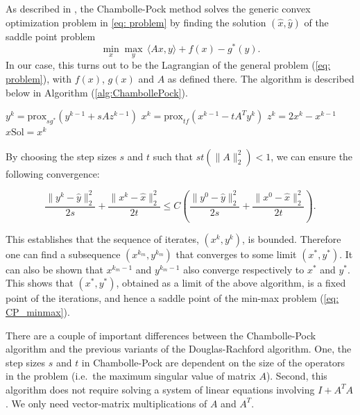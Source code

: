 \documentclass[12pt]{article}
\begin{document}
As described in \cite{Chambolle2010}, the Chambolle-Pock method solves the generic convex optimization problem in \ref{eq: problem} by finding the solution $(\hat{x}, \hat{y})$ of the saddle point problem
\begin{equation}
 \min_{x}\max_{y} \, \langle Ax, y \rangle + f(x) - g^{*}(y). \label{eq: CP_minmax}
\end{equation}
In our case, this turns out to be the Lagrangian of the general
problem (\ref{eq: problem}),  with $f(x)$, $g(x)$ and $A$ as defined
there. The algorithm is described below in Algorithm (\ref{alg:ChambollePock}). 

\begin{algorithm}[h!]

 {
  $ y^k = \text{prox}_{sg^{*}}(y^{k - 1} + sAz^{k-1})$    \;
  $ x^k = \text{prox}_{tf}(x^{k-1} - tA^{T}y^{k})$ \;
  $	z^{k}  = 2x^{k}  - x^{k-1} $ \;
} 
\Return $x\text{Sol} = x^{k}$\;
\caption{Chambolle-Pock Algorithm}\label{alg:ChambollePock} 
\end{algorithm}
By choosing the step sizes $s$ and $t$ such that $st(\|A\|_{2}^{2}) < 1$, we can ensure the following convergence:

\begin{equation}
 \frac{\| y^{k} - \hat{y}\|_{2}^{2}}{2s}  + \frac{\| x^{k} - \hat{x} \|_{2}^{2}}{2t} \leq C \left(\frac{\| y^0 - \hat{y}\|_{2}^{2}}{2s}  + \frac{\|x^0 - \hat{x}\|_{2}^{2}}{2t} \right). \label{eq: CP_conv}
\end{equation}

This establishes that the sequence of iterates, $(x^k, y^k)$, is bounded. Therefore one can find a subsequence $(x^{k_m}, y^{k_m})$ that converges to some limit $(x^*, y^*)$. It can also be shown that $x^{k_m - 1}$ and $y^{k_m - 1}$ also converge respectively to $x^*$ and $y^*$. This shows that $(x^*, y^*)$, obtained as a limit of the above algorithm, is a fixed point of the iterations, and hence a saddle point of the min-max problem (\ref{eq: CP_minmax}). 

There are a couple of important differences between the Chambolle-Pock
algorithm and the previous variants of the Douglas-Rachford
algorithm. One, the step sizes $s$ and $t$  in Chambolle-Pock are
dependent on the size of the operators in the problem (i.e.\ the
maximum singular value of matrix $A$). Second, this algorithm does not
require solving a system of linear equations involving $I +
A^{T}A$. We only need vector-matrix multiplications of $A$ and $A^{T}$. 
\end{document}
